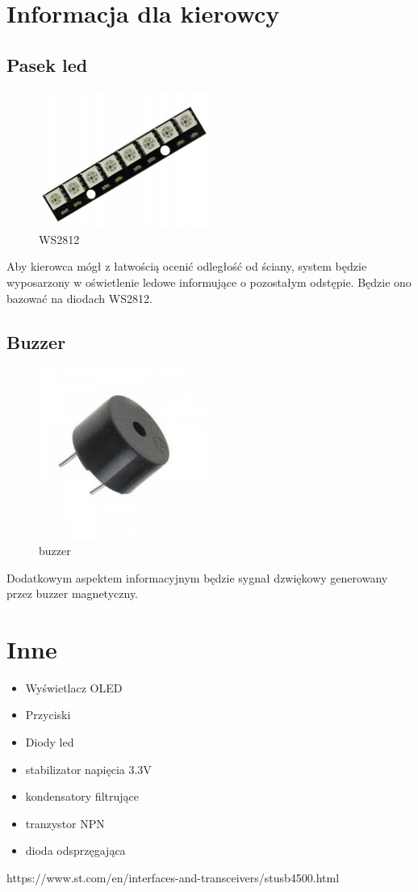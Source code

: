 \documentclass[12pt]{article}
\begin{document}
\section{Informacja dla kierowcy}

\subsection{Pasek led}
\begin{figure}[H]
	\centering
	\includegraphics[width=0.5\textwidth]{figures/ws2812.jpg}
	\caption{WS2812}
	\label{fig:ws2812}
\end{figure}
Aby kierowca mógł z łatwością ocenić odległość od ściany, system będzie
wyposarzony w oświetlenie ledowe informujące o pozostałym odstępie.
Będzie ono bazować na diodach WS2812.

\subsection{Buzzer}
\begin{figure}[H]
	\centering
	\includegraphics[width=0.5\textwidth]{figures/buzzer.jpg}
	\caption{buzzer}
	\label{fig:buzzer}
\end{figure}
Dodatkowym aspektem informacyjnym będzie sygnał dzwiękowy generowany
przez buzzer magnetyczny.

\section{Inne}
\begin{itemize}
    \item Wyświetlacz OLED
    \item Przyciski
    \item Diody led
    \item stabilizator napięcia 3.3V
    \item kondensatory filtrujące
    \item tranzystor NPN
    \item dioda odsprzęgająca
\end{itemize}

\begin{thebibliography}{99}
 https://www.st.com/en/interfaces-and-transceivers/stusb4500.html
\end{thebibliography}
\end{document}

